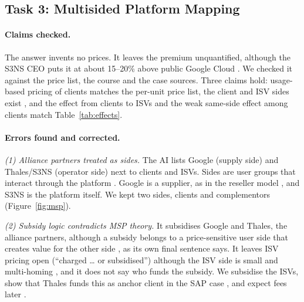 \subsection{Task 3: Multisided Platform Mapping}


\paragraph{Claims checked.}
The answer invents no prices. It leaves the premium unquantified, although the S3NS CEO puts it at about 15--20\% above public Google Cloud \parencite{paperjam2026}. We checked it against the price list, the course and the case sources. Three claims hold: usage-based pricing of clients matches the per-unit price list, the client and ISV sides exist \parencite{s3nsecosystem}, and the effect from clients to ISVs and the weak same-side effect among clients match Table~\ref{tab:effects}.

\paragraph{Errors found and corrected.}
\textit{(1) Alliance partners treated as sides.} The AI lists Google (supply side) and Thales/S3NS (operator side) next to clients and ISVs. Sides are user groups that interact through the platform \parencite[p.~150]{overby2021}. Google is a supplier, as in the reseller model \parencite[slide 40]{windekilde2026msp}, and S3NS is the platform itself. We kept two sides, clients and complementors (Figure~\ref{fig:msp}).

\textit{(2) Subsidy logic contradicts MSP theory.} It subsidises Google and Thales, the alliance partners, although a subsidy belongs to a price-sensitive user side that creates value for the other side \parencite{rochet2006}, as its own final sentence says. It leaves ISV pricing open (``charged \ldots{} or subsidised'') although the ISV side is small and multi-homing \parencite{futurum2026}, and it does not say who funds the subsidy. We subsidise the ISVs, show that Thales funds this as anchor client in the SAP case \parencite{thalessap2026}, and expect fees later \parencite{armstrong2006}.

